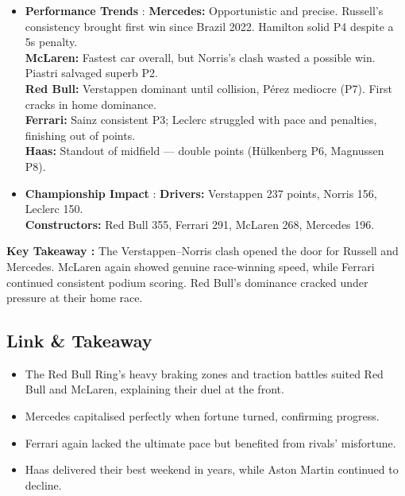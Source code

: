 \begin{itemize}
    \item \textbf{Performance Trends} : \textbf{Mercedes:} Opportunistic and precise. Russell’s consistency brought first win since Brazil 2022. Hamilton solid P4 despite a 5s penalty. \\
    \textbf{McLaren:} Fastest car overall, but Norris’s clash wasted a possible win. Piastri salvaged superb P2. \\
    \textbf{Red Bull:} Verstappen dominant until collision, Pérez mediocre (P7). First cracks in home dominance. \\
    \textbf{Ferrari:} Sainz consistent P3; Leclerc struggled with pace and penalties, finishing out of points. \\
    \textbf{Haas:} Standout of midfield — double points (Hülkenberg P6, Magnussen P8).
    
    \item \textbf{Championship Impact} : \textbf{Drivers:} Verstappen 237 points, Norris 156, Leclerc 150.\\
    \textbf{Constructors:} Red Bull 355, Ferrari 291, McLaren 268, Mercedes 196.    
\end{itemize}

\textbf{Key Takeaway :}
The Verstappen–Norris clash opened the door for Russell and Mercedes. McLaren again showed genuine race-winning speed, while Ferrari continued consistent podium scoring. Red Bull’s dominance cracked under pressure at their home race.


\subsection{Link \& Takeaway}

\begin{itemize}
    \item The Red Bull Ring’s heavy braking zones and traction battles suited Red Bull and McLaren, explaining their duel at the front. 
    \item Mercedes capitalised perfectly when fortune turned, confirming progress. 
    \item Ferrari again lacked the ultimate pace but benefited from rivals’ misfortune.
    \item Haas delivered their best weekend in years, while Aston Martin continued to decline.
\end{itemize}